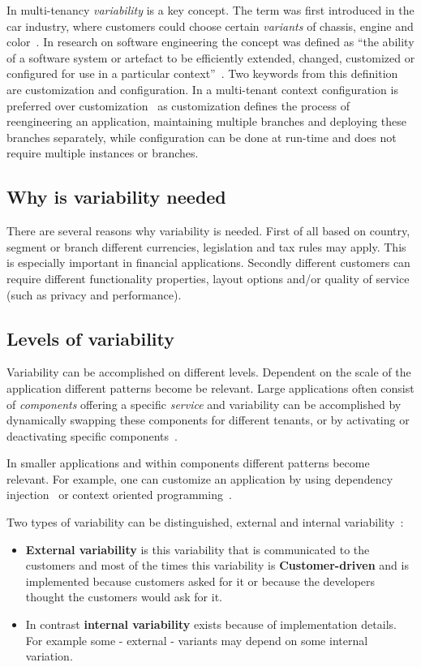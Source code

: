 In multi-tenancy \textit{variability} is a key concept. The term was first introduced in the car industry, where customers could choose certain \textit{variants} of chassis, engine and color~\cite[p. 153]{kabbedijk2011variability}. 
In research on software engineering the concept was defined as ``the ability of a software system or artefact to be efficiently extended, changed, customized or configured for use in a particular context''~\cite{svahnberg2005taxonomy}.
Two keywords from this definition are customization and configuration. In a multi-tenant context configuration is preferred over customization~\cite{sun2008software} as customization defines the process of reengineering an application, maintaining multiple branches and deploying these branches separately, while configuration can be done at run-time and does not require multiple instances or branches.

\subsection{Why is variability needed}
There are several reasons why variability is needed. 
First of all based on country, segment or branch different currencies, legislation and tax rules may apply. This is especially important in financial applications. 
Secondly different customers can require different functionality properties, layout options and/or quality of service (such as privacy and performance).

\subsection{Levels of variability}
Variability can be accomplished on different levels. 
Dependent on the scale of the application different patterns become be relevant. Large applications often consist of \textit{components} offering a specific \textit{service} and variability can be accomplished by dynamically swapping these components for different tenants, or by activating or deactivating specific components~\cite{mietzner2008defining}. 

In smaller applications and within components different patterns become relevant. For example, one can customize an application by using dependency injection~\cite{walraven2011middleware} or context oriented programming~\cite{truyen2012context}.

Two types of variability can be distinguished, external and internal variability~\cite{mietzner2009variability}:
 \begin{itemize}
\item \textbf{External variability} is this variability that is communicated to the customers and most of the times this variability is \textbf{Customer-driven} and is implemented because customers asked for it or because the developers thought the customers would ask for it. 
\item In contrast  \textbf{internal variability} exists because of implementation details. For example some - external - variants may depend on some internal variation.
\end{itemize}


